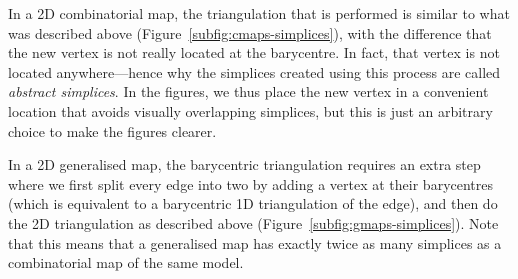 In a 2D combinatorial map, the triangulation that is performed is similar to what was described above (Figure~\ref{subfig:cmaps-simplices}), with the difference that the new vertex is not really located at the barycentre.
In fact, that vertex is not located anywhere---hence why the simplices created using this process are called \emph{abstract simplices}.
In the figures, we thus place the new vertex in a convenient location that avoids visually overlapping simplices, but this is just an arbitrary choice to make the figures clearer.

In a 2D generalised map, the barycentric triangulation requires an extra step where we first split every edge into two by adding a vertex at their barycentres (which is equivalent to a barycentric 1D triangulation of the edge), and then do the 2D triangulation as described above (Figure~\ref{subfig:gmaps-simplices}).
Note that this means that a generalised map has exactly twice as many simplices as a combinatorial map of the same model.

